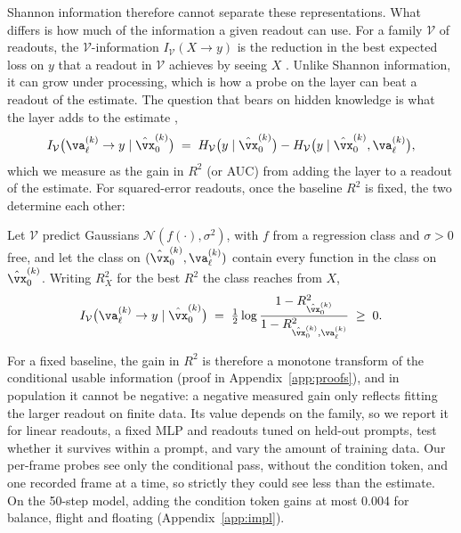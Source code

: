 Shannon information therefore cannot separate these representations. What differs is how much of the information a given readout can use. For a family $\mathcal V$ of readouts, the $\mathcal V$-information $I_{\mathcal V}(X \to y)$ is the reduction in the best expected loss on $y$ that a readout in $\mathcal V$ achieves by seeing $X$ \citep{xu2020vinfo}. Unlike Shannon information, it can grow under processing, which is how a probe on the layer can beat a readout of the estimate. The question that bears on hidden knowledge is what the layer adds to the estimate \citep{hewitt2021conditional},
\begin{equation}
    I_{\mathcal V}\big(\va_\ell^{(k)} \to y \mid \hat\vx_0^{(k)}\big) \;=\; H_{\mathcal V}\big(y \mid \hat\vx_0^{(k)}\big) - H_{\mathcal V}\big(y \mid \hat\vx_0^{(k)}, \va_\ell^{(k)}\big),
\end{equation}
which we measure as the gain in $R^2$ (or AUC) from adding the layer to a readout of the estimate. For squared-error readouts, once the baseline $R^2$ is fixed, the two determine each other:
\begin{proposition}\label{prop:vinfo}
Let $\mathcal V$ predict Gaussians $\mathcal N(f(\cdot), \sigma^2)$, with $f$ from a regression class and $\sigma > 0$ free, and let the class on $(\hat\vx_0^{(k)}, \va_\ell^{(k)})$ contain every function in the class on $\hat\vx_0^{(k)}$. Writing $R^2_X$ for the best $R^2$ the class reaches from $X$,
\begin{equation}
    I_{\mathcal V}\big(\va_\ell^{(k)} \to y \mid \hat\vx_0^{(k)}\big) \;=\; \tfrac12 \log \frac{1 - R^2_{\hat\vx_0^{(k)}}}{1 - R^2_{\hat\vx_0^{(k)}, \va_\ell^{(k)}}} \;\ge\; 0 .
\end{equation}
\end{proposition}
For a fixed baseline, the gain in $R^2$ is therefore a monotone transform of the conditional usable information (proof in Appendix~\ref{app:proofs}), and in population it cannot be negative: a negative measured gain only reflects fitting the larger readout on finite data. Its value depends on the family, so we report it for linear readouts, a fixed MLP and readouts tuned on held-out prompts, test whether it survives within a prompt, and vary the amount of training data. Our per-frame probes see only the conditional pass, without the condition token, and one recorded frame at a time, so strictly they could see less than the estimate. On the 50-step model, adding the condition token gains at most 0.004 for balance, flight and floating (Appendix~\ref{app:impl}).

